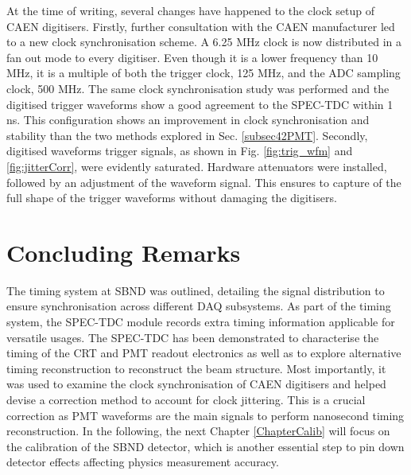 At the time of writing, several changes have happened to the clock setup of CAEN digitisers.
Firstly, further consultation with the CAEN manufacturer led to a new clock synchronisation scheme.
A 6.25 MHz clock is now distributed in a fan out mode to every digitiser.
Even though it is a lower frequency than 10 MHz, it is a multiple of both the trigger clock, 125 MHz, and the ADC sampling clock, 500 MHz.
The same clock synchronisation study was performed and the digitised trigger waveforms show a good agreement to the SPEC-TDC within 1 ns.
This configuration shows an improvement in clock synchronisation and stability than the two methods explored in Sec. \ref{subsec42PMT}.    
Secondly, digitised waveforms trigger signals, as shown in Fig. \ref{fig:trig_wfm} and \ref{fig:jitterCorr}, were evidently saturated. 
Hardware attenuators were installed, followed by an adjustment of the waveform signal.
This ensures to capture of the full shape of the trigger waveforms without damaging the digitisers.

\section{Concluding Remarks}
\label{sec5Remarks}

The timing system at SBND was outlined, detailing the signal distribution to ensure synchronisation across different DAQ subsystems. 
As part of the timing system, the SPEC-TDC module records extra timing information applicable for versatile usages.
The SPEC-TDC has been demonstrated to characterise the timing of the CRT and PMT readout electronics as well as to explore alternative timing reconstruction to reconstruct the beam structure. 
Most importantly, it was used to examine the clock synchronisation of CAEN digitisers and helped devise a correction method to account for clock jittering. 
This is a crucial correction as PMT waveforms are the main signals to perform nanosecond timing reconstruction.
In the following, the next Chapter \ref{ChapterCalib} will focus on the calibration of the SBND detector, which is another essential step to pin down detector effects affecting physics measurement accuracy.



